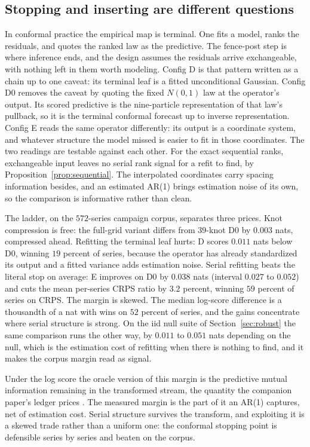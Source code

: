 \documentclass[11pt]{article}
\theoremstyle{remark}
\begin{document}
\subsection{Stopping and inserting are different questions}\label{sec:interior}

In conformal practice the empirical map is terminal. One fits a model, ranks the
residuals, and quotes the ranked law as the predictive. The fence-post step is where
inference ends, and the design assumes the residuals arrive exchangeable, with nothing
left in them worth modeling. Config D is that pattern written as a chain up to one caveat: its terminal leaf is a
fitted unconditional Gaussian. Config D0 removes the caveat by quoting the fixed
$N(0,1)$ law at the operator's output. Its scored predictive is the nine-particle
representation of that law's pullback, so it is the terminal conformal forecast up
to inverse representation. Config E reads
the same operator differently: its output is a coordinate system, and whatever structure
the model missed is easier to fit in those coordinates. The two readings are testable
against each other. For the exact sequential ranks, exchangeable input leaves no serial
rank signal for a refit to find, by Proposition~\ref{prop:sequential}. The interpolated
coordinates carry spacing information besides, and an estimated AR(1) brings estimation
noise of its own, so the comparison is informative rather than clean.

The ladder, on the $572$-series campaign corpus, separates three prices. Knot
compression is free: the full-grid variant differs from $39$-knot D0 by $0.003$
nats, compressed ahead. Refitting the terminal leaf hurts: D scores $0.011$ nats
below D0, winning $19$ percent of series, because the operator has already
standardized its output and a fitted variance adds estimation noise. Serial
refitting beats the literal stop on average: E improves on D0 by $0.038$ nats
(interval $0.027$ to $0.052$) and cuts the mean per-series CRPS ratio by $3.2$
percent, winning $59$ percent of series on CRPS. The margin is skewed. The median
log-score difference is a thousandth of a nat with wins on $52$ percent of series,
and the gains concentrate where serial structure is strong. On the iid null suite of
Section~\ref{sec:robust} the same comparison runs the other way, by $0.011$ to
$0.051$ nats depending on the null, which is the estimation cost of refitting when
there is nothing to find, and it makes the corpus margin read as signal.

Under the log score the oracle version of this
margin is the predictive mutual information remaining in the transformed stream, the
quantity the companion paper's ledger prices \citep{cotton2026gap}. The measured margin
is the part of it an AR(1) captures, net of estimation cost. Serial structure survives
the transform, and exploiting it is a skewed trade rather than a uniform one: the
conformal stopping point is defensible series by series and beaten on the corpus.
\end{document}
